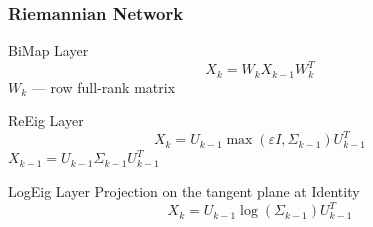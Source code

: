 \documentclass{beamer}
\begin{document}

%
%
%


\begin{frame}
\frametitle{Riemannian Network}
\begin{block}{BiMap Layer}
	\begin{equation*}
		X_k = W_k X_{k-1}W_k^T
	\end{equation*}
	$W_k$ --- row full-rank matrix
\end{block}

\begin{block}{ReEig Layer}
	\begin{equation*}
	X_k = U_{k-1} \max (\varepsilon I, \Sigma_{k-1})U_{k-1}^T
	\end{equation*}
	$X_{k-1} = U_{k-1}\Sigma_{k-1} U_{k-1}^T$
\end{block}

\begin{block}{LogEig Layer}
	Projection on the tangent plane at Identity
	\begin{equation*}
	X_k = U_{k-1} \log ( \Sigma_{k-1})U_{k-1}^T
	\end{equation*}
\end{block}

\end{frame}
\end{document}
